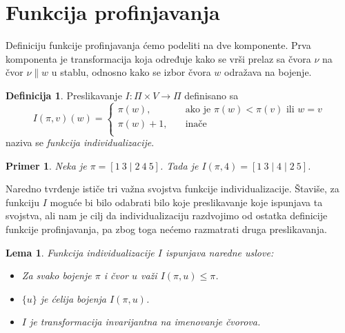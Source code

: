 \documentclass[12pt,oneside]{memoir}
\newtheorem{lemma}{Lema}
\newtheorem{example}{Primer}
\theoremstyle{definition}
\newtheorem*{definition}{Definicija}
\begin{document}
 \section{Funkcija profinjavanja}

  Definiciju funkcije profinjavanja ćemo podeliti na dve komponente. Prva
  komponenta je transformacija koja određuje kako se vrši prelaz sa čvora $\nu$
  na čvor $\nu \| w$ u stablu, odnosno kako se izbor čvora $w$ odražava na
  bojenje.

  \begin{definition}
	  Preslikavanje $I : \Pi \times V \to \Pi$ definisano sa
	  $$
	  I(\pi, v)(w) =
	  \begin{cases}
		  \pi(w), & \quad \text{ako je } \pi(w) < \pi(v) \text{ ili } w = v \\
		  \pi(w) + 1, & \quad \text{inače}\\
	  \end{cases}
	  $$
	  naziva se \emph{funkcija individualizacije}.
  \end{definition}

  \begin{example}
	  Neka je $\pi = [1\ 3 \mid 2\ 4\ 5]$. Tada je $I(\pi, 4) = [1\ 3 \mid 4
	  \mid 2\ 5]$.
  \end{example}

  Naredno tvrđenje ističe tri važna svojstva funkcije individualizacije.
  Štaviše, za funkciju $I$ moguće bi bilo odabrati bilo koje preslikavanje koje
  ispunjava ta svojstva, ali nam je cilj da individualizaciju razdvojimo od
  ostatka definicije funkcije profinjavanja, pa zbog toga nećemo razmatrati
  druga preslikavanja.
  
  \begin{lemma}
	  Funkcija individualizacije $I$ ispunjava naredne uslove:
	  \begin{itemize}
		  \item[(I1)] Za svako bojenje $\pi$ i čvor $u$ važi $I(\pi, u) \leq \pi$.
		  \item[(I2)] $\{u\}$ je ćelija bojenja $I(\pi, u)$.
		  \item[(I3)] $I$ je transformacija invarijantna na imenovanje čvorova.
	  \end{itemize}
  \end{lemma}
  
\end{document}
